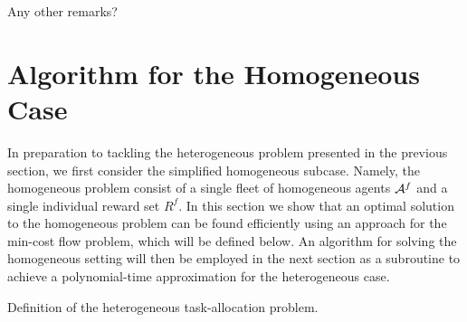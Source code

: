 \documentclass[conference]{IEEEtran}
\newcommand{\todo}[1]{{\color{red}{\bf TODO:} #1}}
\newcommand{\todo}[1]{}
\begin{document}
\todo{Any other remarks?}


\section{Algorithm for the Homogeneous Case}\label{sec:homogeneous}
In preparation to tackling the heterogeneous problem presented in the previous section, we first consider the simplified homogeneous subcase. Namely, the homogeneous problem consist of a single fleet of homogeneous agents $\mathcal{A}^f$ and a single individual reward set $R^f$. In this section we show that an optimal solution to the homogeneous problem can be found efficiently using an approach for the min-cost flow problem, which will be defined below. An algorithm for solving the homogeneous setting will then be employed in the next section as a subroutine to achieve a polynomial-time approximation for the heterogeneous case.

\begin{table}[!ht]
\label{tbl:homogeneous}
\noindent{}
\vspace{5pt}
\caption{Definition of the heterogeneous task-allocation problem.}
\end{table}
\end{document}
